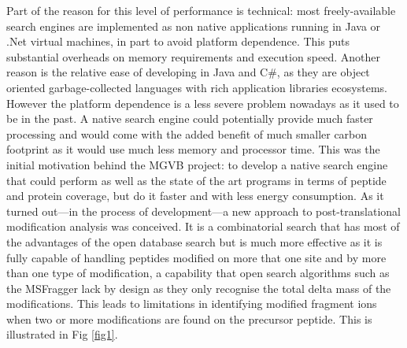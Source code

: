 \documentclass[default]{sn-jnl}
\theoremstyle{thmstyleone}%
\theoremstyle{thmstyletwo}%
\theoremstyle{thmstylethree}%
\begin{document}
Part of the reason for this level of performance is technical: most freely-available search engines are implemented as non native applications running in Java or .Net virtual machines, in part to avoid platform dependence. This puts substantial overheads on memory requirements and execution speed. Another reason is the relative ease of developing in Java and C\#, as they are object oriented garbage-collected languages with rich application libraries ecosystems. However the platform dependence is a less severe problem nowadays as it used to be in the past. A native search engine could potentially provide much faster processing and would come with the added benefit of much smaller carbon footprint as it would use much less memory and processor time. This was the initial motivation behind the MGVB project: to develop a native search engine that could perform as well as the state of the art programs in terms of peptide and protein coverage, but do it faster and with less energy consumption. As it turned out—in the process of development—a new approach to post-translational modification analysis was conceived. It is a combinatorial search that has most of the advantages of the open database search but is much more effective as it is fully capable of handling peptides modified on more that one site and by more than one type of modification, a capability that open search algorithms such as the MSFragger lack by design as they only recognise the total delta mass of the modifications.  This leads to limitations in identifying modified fragment ions when two or more modifications are found on the precursor peptide. This is illustrated in Fig \ref {fig1}.
\end{document}
